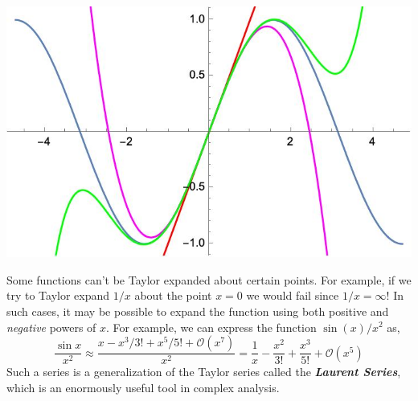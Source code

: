 \documentclass[10pt]{article}
\begin{document}
\begin{enumerate}[label=\alph*)]
\begin{solution}
				\begin{center}
					\includegraphics[scale=0.5]{sine.jpeg}
				\end{center}
			\end{solution}
	\end{enumerate}
	Some functions can't be Taylor expanded about certain points. For example, if we try to Taylor expand
	$1/x$ about the point $x = 0$ we would fail since $1/x = \infty$! In such cases, it may be possible to expand
	the function using both positive and \textit{negative} powers of $x$. For example, we can express the 
	function $\sin(x)/x^2$ as,
	\[
		\frac{\sin x}{x^2} \approx \frac{x - x^3/3! + x^5/5! + \mathcal O(x^7)}{x^2} = \frac{1}{x} -
		\frac{x^2}{3!} + \frac{x^3}{5!} + \mathcal O(x^5)
	\] 
	Such a series is a generalization of the Taylor series called the \textbf{\textit{Laurent Series}}, which 
	is an enormously useful tool in complex analysis.
\end{document}
